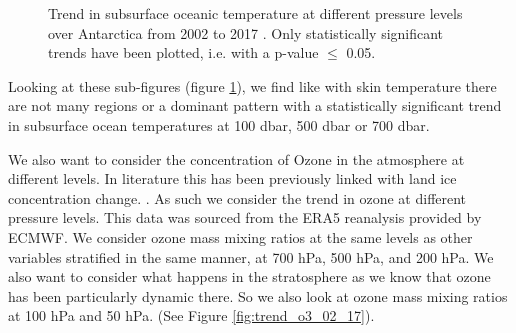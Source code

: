 \documentclass[../main.tex]{subfiles}
\begin{document}
\begin{figure}[!hbt]
\begin{subfigure}[b]{0.3\textwidth}
    \end{subfigure}
    \caption{Trend in subsurface oceanic temperature at different pressure levels over Antarctica from 2002 to 2017 . Only statistically significant trends have been plotted, i.e. with a p-value $\leq$ 0.05.}
    \label{fig:trend_subsurtemp_02_17}
\end{figure}

Looking at these sub-figures (figure \ref{fig:trend_subsurtemp_02_17}), we find like with skin temperature there are not many regions or a dominant pattern with a statistically significant trend in subsurface ocean temperatures at 100 dbar, 500 dbar or 700 dbar. 

We also want to consider the concentration of Ozone in the atmosphere at different levels. In literature this has been previously linked with land ice concentration change. . As such we consider the trend in ozone at different pressure levels. This data was sourced from the ERA5 reanalysis provided by ECMWF. We consider ozone mass mixing ratios at the same levels as other variables stratified  in the same manner, at 700 hPa, 500 hPa, and 200 hPa. We also want to consider what happens in the stratosphere as we know that ozone has been particularly dynamic there. So we also look at ozone mass mixing ratios at 100 hPa and 50 hPa. (See Figure \ref{fig:trend_o3_02_17}).
\end{document}
